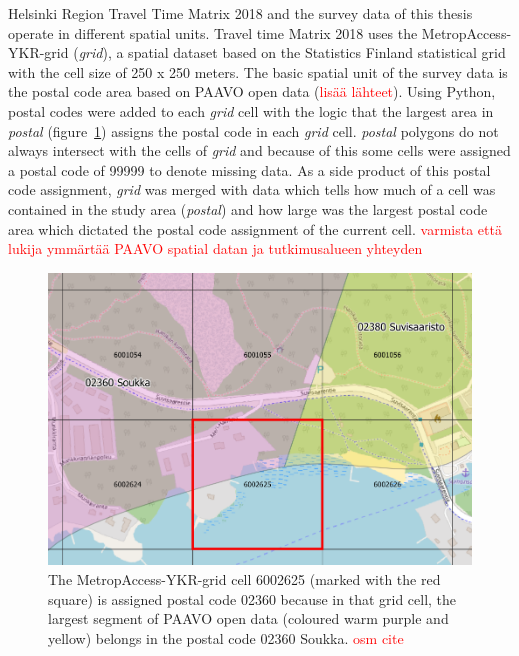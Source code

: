 Helsinki Region Travel Time Matrix 2018 and the survey data of this thesis operate in different spatial units. Travel time Matrix 2018 uses the MetropAccess-YKR-grid (\textit{grid}), a spatial dataset based on the Statistics Finland statistical grid with the cell size of 250 x 250 meters. The basic spatial unit of the survey data is the postal code area based on PAAVO open data (\textcolor{red}{lisää lähteet}). Using Python, postal codes were added to each \textit{grid} cell with the logic that the largest area in \textit{postal} (figure~\ref{fig:paavo_ykr}) assigns the postal code in each \textit{grid} cell. \textit{postal} polygons do not always intersect with the cells of \textit{grid} and because of this some cells were assigned a postal code of 99999 to denote missing data. As a side product of this postal code assignment, \textit{grid} was merged with data which tells how much of a cell was contained in the study area (\textit{postal}) and how large was the largest postal code area which dictated the postal code assignment of the current cell. \textcolor{red}{varmista että lukija ymmärtää PAAVO spatial datan ja tutkimusalueen yhteyden}

\begin{figure}[H]%
    \includegraphics[width=\textwidth]{images/paavo-ykr.png}
    \caption[Assigning MetropAccess-YKR-grid postal codes]{The MetropAccess-YKR-grid cell 6002625 (marked with the red square) is assigned postal code 02360 because in that grid cell, the largest segment of PAAVO open data (coloured warm purple and yellow) belongs in the postal code 02360 Soukka. \textcolor{red}{osm cite}}%
    \label{fig:paavo_ykr}%
\end{figure}

